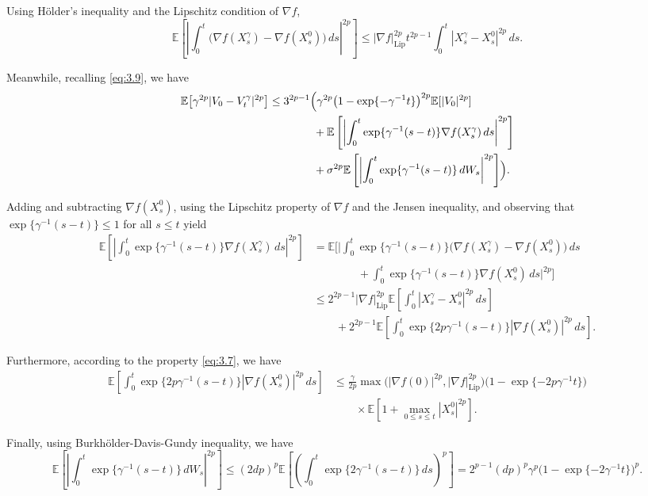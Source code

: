 \documentclass[11pt]{article}
\theoremstyle{remark}
\begin{document}
Using H\"older's inequality and the Lipschitz condition of $\nabla f$,
\[
\mathbb{E}\left[\left|\int_0^t \bigl(\nabla f(X_s^{\gamma})-\nabla f(X_s^0)\bigr)\,ds\right|^{2p}\right]\le |\nabla f|_{\mathrm{Lip}}^{2p} t^{2p-1}\int_0^t |X_s^{\gamma}-X_s^0|^{2p}\,ds.
\]

Meanwhile, recalling \eqref{eq:3.9}, we have
\[
\begin{aligned}
\mathbb{E}\bigl[\gamma^{2p}|V_0-V_t^{\gamma}|^{2p}\bigr]
&\le 3^{2p-1}\Bigl(\gamma^{2p}\bigl(1-\exp\{-\gamma^{-1}t\}\bigr)^{2p}\mathbb{E}[|V_0|^{2p}] \\
&\qquad\qquad +\mathbb{E}\left[\left|\int_0^t \exp\{\gamma^{-1}(s-t)\}\nabla f(X_s^{\gamma})\,ds\right|^{2p}\right] \\
&\qquad\qquad +\sigma^{2p}\mathbb{E}\left[\left|\int_0^t \exp\{\gamma^{-1}(s-t)\}\,dW_s\right|^{2p}\right]\Bigr).
\end{aligned}
\]


Adding and subtracting $\nabla f(X_s^0)$, using the Lipschitz property of $\nabla f$ and the Jensen inequality, and observing that $\exp\{\gamma^{-1}(s-t)\}\le 1$ for all $s\le t$ yield
\[
\begin{aligned}
\mathbb{E}\left[\left|\int_0^t \exp\{\gamma^{-1}(s-t)\}\nabla f(X_s^{\gamma})\,ds\right|^{2p}\right]
&=\mathbb{E}\Biggl[\Biggl|\int_0^t \exp\{\gamma^{-1}(s-t)\}\bigl(\nabla f(X_s^{\gamma})-\nabla f(X_s^0)\bigr)\,ds \\
&\qquad\qquad +\int_0^t \exp\{\gamma^{-1}(s-t)\}\nabla f(X_s^0)\,ds\Biggr|^{2p}\Biggr] \\
&\le 2^{2p-1}|\nabla f|_{\mathrm{Lip}}^{2p}\mathbb{E}\left[\int_0^t |X_s^{\gamma}-X_s^0|^{2p}\,ds\right] \\
&\qquad +2^{2p-1}\mathbb{E}\left[\int_0^t \exp\{2p\gamma^{-1}(s-t)\}|\nabla f(X_s^0)|^{2p}\,ds\right].
\end{aligned}
\]

Furthermore, according to the property \eqref{eq:3.7}, we have
\[
\begin{aligned}
\mathbb{E}\left[\int_0^t \exp\{2p\gamma^{-1}(s-t)\}|\nabla f(X_s^0)|^{2p}\,ds\right]
&\le \frac{\gamma}{2p}\max\bigl(|\nabla f(0)|^{2p},|\nabla f|_{\mathrm{Lip}}^{2p}\bigr)\bigl(1-\exp\{-2p\gamma^{-1}t\}\bigr) \\
&\qquad\times \mathbb{E}\left[1+\max_{0\le s\le t}|X_s^0|^{2p}\right].
\end{aligned}
\]

Finally, using Burkh\"older-Davis-Gundy inequality, we have
\[
\mathbb{E}\left[\left|\int_0^t \exp\{\gamma^{-1}(s-t)\}\,dW_s\right|^{2p}\right]
\le (2dp)^p\mathbb{E}\left[\left(\int_0^t \exp\{2\gamma^{-1}(s-t)\}\,ds\right)^p\right]
=2^{p-1}(dp)^p\gamma^p\bigl(1-\exp\{-2\gamma^{-1}t\}\bigr)^p.
\]
\end{document}
